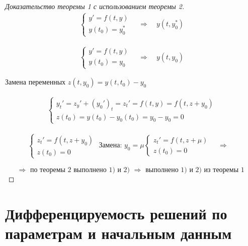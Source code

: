 \documentclass[12pt, a4paper]{report}
\begin{document}
\begin{proof}[Доказательство теоремы 1 с использованием теоремы 2]

    \[  \] 
    \[ \begin{aligned}
    \begin{cases}
    y ' = f(t ,y ) \\
    y (t_0 ) = y_0^ * 
    \end{cases}
    \quad  \Rightarrow \quad  y (t, y_0 ^*)
    \end{aligned} \] 
    
    \[ \begin{aligned}
        \begin{cases}
        y ' = f(t ,y ) \\
        y (t_0 ) = y_0
        \end{cases}
        \quad  \Rightarrow \quad  y (t, y_0)
        \end{aligned} \] 

        Замена переменных \( z(t, y_0 ) = y (t, t_0 ) - y_0 \) 

        \[ \begin{aligned}
        \begin{cases}
            y_t ' = z_y ' + (y_0  ' )_t  = z_t ' = f(t,y ) = f(t,z+ y_0) \\  
            z(t_0 ) = y(t_0  ) - y_0(t_0 ) = y_0 - y_0 = 0
        \end{cases}
        \end{aligned} \] 

        \[ \begin{aligned}
        \begin{cases}
            z_t ' = f(t , z+ y_0 ) \\ 
            z(t_0 )= 0 
        \end{cases}
        \text{ Замена: } y_0 = \mu
        \begin{cases}
        z_t ' = f(t, z+ \mu ) \\ 
        z(t_0 ) = 0
        \end{cases}  
        \quad \Rightarrow \quad  
        \end{aligned} \] 

        \[ \Rightarrow \text{ по теоремы 2 выполнено 1) и 2) } \Rightarrow \text{ выполнено 1) и 2) из теоремы 1 }   \] 
\end{proof}

\section{Дифференцируемость решений по параметрам и начальным данным}
\end{document}
